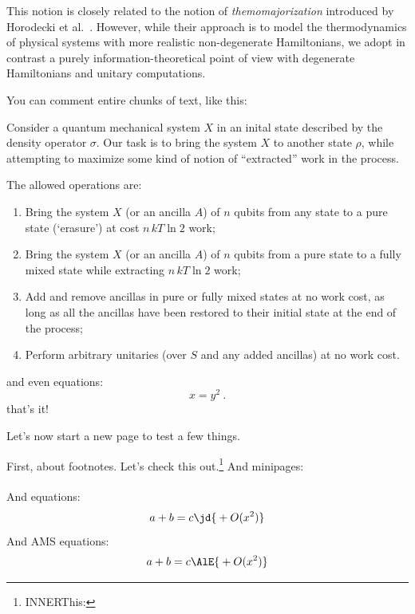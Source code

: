 \documentclass[10pt,a4paper,aps,reprint,notitlepage,nofootinbib]{revtex4-1}
\begin{document}
This notion is closely related to the notion of {\em themomajorization} introduced by
Horodecki et al.~\cite{Horodecki2013_ThermoMaj}. However, while their approach is to model
the thermodynamics of physical systems with more realistic non-degenerate Hamiltonians, we
adopt in contrast a purely information-theoretical point of view with degenerate
Hamiltonians and unitary computations.

\phf* You can comment entire chunks of text, like this:

Consider a quantum mechanical system $X$ in an inital state described by the
density operator $\sigma$.  Our task is to bring the system $X$ to another state
$\rho$, while attempting to maximize some kind of notion of ``extracted'' work
in the process.

The allowed operations are:
\begin{enumerate}[label=(\alph*)]
\item Bring the system $X$ (or an ancilla $A$) of $n$ qubits from any state to a pure state (`erasure') at
  cost $n\,kT\ln 2$ work;
\item Bring the system $X$ (or an ancilla $A$) of $n$ qubits from a pure state to a fully mixed state while
  extracting $n\,kT\ln 2$ work;
\item Add and remove ancillas in pure or fully mixed states at no work cost, as long as all the ancillas have
  been restored to their initial state at the end of the process;
\item Perform arbitrary unitaries (over $S$ and any added ancillas) at no work cost.
\end{enumerate}

and even equations:
\begin{equation}
  x = y^2\ .
\end{equation}
that's it! \endphf

\clearpage
\onecolumngrid
Let's now start a new page to test a few things.

First, about footnotes. Let's check this out.\footnote{\ifinner INNER\fi This: }  And minipages:
\\
\\
And equations:
\begin{equation}
  a + b = c \text{\jd{\(\displaystyle{}+O(x^2)\)}}
\end{equation}
And AMS equations:
\begin{align}
  a + b = c \text{\AlE{\(\displaystyle{}+O(x^2)\)}}
\end{align}
\end{document}

